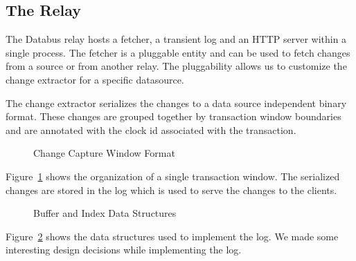 \subsection{The Relay}
The Databus relay hosts a fetcher, a transient log and an HTTP server within a single process. The fetcher is a pluggable entity and can be used to fetch changes from a source or from another relay. The pluggability allows us to customize the change extractor for a specific datasource.

The change extractor serializes the changes to a data source independent
binary format. These changes are grouped together by transaction window boundaries and are annotated with the clock id associated with the transaction. 
\begin{figure}
\centering
{}
\caption{Change Capture Window Format}
\label{fig:change-capture-window-format}
\end{figure}
Figure~\ref{fig:change-capture-window-format} shows the organization of a single transaction window.
The serialized changes are stored in the log which is used to serve the changes to the clients. 
\begin{figure}
\centering
{}
\caption{Buffer and Index Data Structures}
\label{fig:buffer-index}
\end{figure}
Figure~\ref{fig:buffer-index} shows the data structures used to implement the log. We made some interesting design decisions while implementing the log. 
